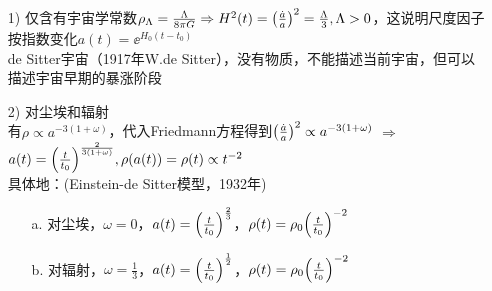 \begin{itemize}
	\item[1)] 仅含有宇宙学常数$\rho_{\Lambda} = \frac{\Lambda}{8 \pi G} \Rightarrow H^2(t) = \qty(\frac{\dot{a}}{a})^2 = \frac{\Lambda}{3}, \Lambda > 0$，这说明尺度因子按指数变化$a(t) = \ee^{H_0 (t - t_0)}$ \\
	de Sitter宇宙（1917年W.de Sitter），没有物质，不能描述当前宇宙，但可以描述宇宙早期的暴涨阶段
	
	\item[2)] 对尘埃和辐射 \\
	有$\rho \propto a^{-3(1+\omega)}$，代入Friedmann方程得到$\qty(\frac{\dot{a}}{a})^2 \propto a^{-3(1+\omega)}$ $\Rightarrow$ $a(t) = \qty(\frac{t}{t_0})^{\frac{2}{3(1+\omega)}}, \rho(a(t)) = \rho(t) \propto t^{-2}$ \\
	具体地：(Einstein-de Sitter模型，1932年)
	\begin{itemize}
		\item[a.] 对尘埃，$\omega = 0$，$a(t) = \qty(\frac{t}{t_0})^{\frac{2}{3}}$，$\rho(t) = \rho_0 \qty(\frac{t}{t_0})^{-2}$
		\item[b.] 对辐射，$\omega = \frac{1}{3}$，$a(t) = \qty(\frac{t}{t_0})^{\frac{1}{2}}$，$\rho(t) = \rho_0 \qty(\frac{t}{t_0})^{-2}$
	\end{itemize}
\end{itemize}

